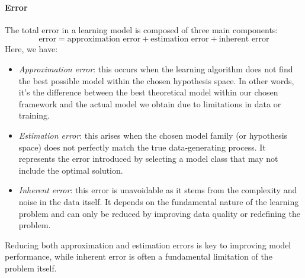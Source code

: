 \paragraph*{Error}
The total error in a learning model is composed of three main components:
\[\text{error} = \text{approximation error} + \text{estimation error} + \text{inherent error}\]
\noindent Here, we have: 
\begin{itemize}
    \item \textit{Approximation error}: this occurs when the learning algorithm does not find the best possible model within the chosen hypothesis space. 
        In other words, it's the difference between the best theoretical model within our chosen framework and the actual model we obtain due to limitations in data or training.
    \item \textit{Estimation error}: this arises when the chosen model family (or hypothesis space) does not perfectly match the true data-generating process. 
        It represents the error introduced by selecting a model class that may not include the optimal solution.
    \item \textit{Inherent error}: this error is unavoidable as it stems from the complexity and noise in the data itself. 
        It depends on the fundamental nature of the learning problem and can only be reduced by improving data quality or redefining the problem. 
\end{itemize}
\noindent Reducing both approximation and estimation errors is key to improving model performance, while inherent error is often a fundamental limitation of the problem itself.

